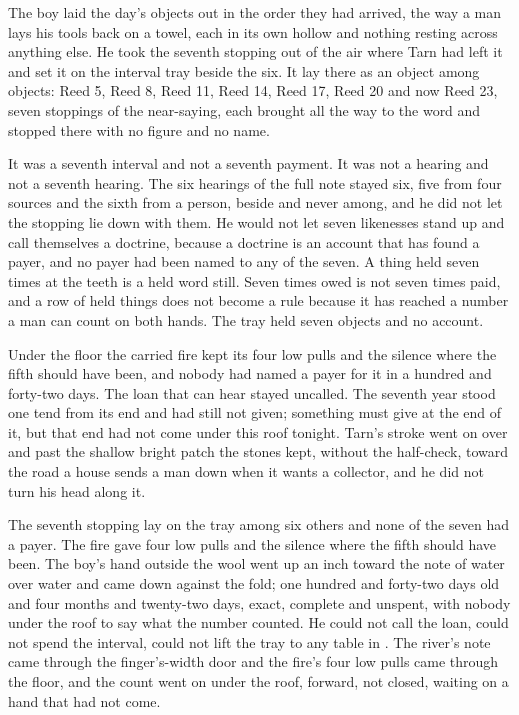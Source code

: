 The boy laid the day's objects out in the order they had arrived, the way a man lays his tools back on a towel, each in its own hollow and nothing resting across anything else. He took the seventh stopping out of the air where Tarn had left it and set it on the interval tray beside the six. It lay there as an object among objects: Reed 5, Reed 8, Reed 11, Reed 14, Reed 17, Reed 20 and now Reed 23, seven stoppings of the near-saying, each brought all the way to the word and stopped there with no figure and no name.

It was a seventh interval and not a seventh payment. It was not a hearing and not a seventh hearing. The six hearings of the full note stayed six, five from four sources and the sixth from a person, beside and never among, and he did not let the stopping lie down with them. He would not let seven likenesses stand up and call themselves a doctrine, because a doctrine is an account that has found a payer, and no payer had been named to any of the seven. A thing held seven times at the teeth is a held word still. Seven times owed is not seven times paid, and a row of held things does not become a rule because it has reached a number a man can count on both hands. The tray held seven objects and no account.

Under the floor the carried fire kept its four low pulls and the silence where the fifth should have been, and nobody had named a payer for it in a hundred and forty-two days. The loan that can hear stayed uncalled. The seventh year stood one tend from its end and had still not given; something must give at the end of it, but that end had not come under this roof tonight. Tarn's stroke went on over  and past the shallow bright patch the stones kept, without the half-check, toward the road a house sends a man down when it wants a collector, and he did not turn his head along it.

The seventh stopping lay on the tray among six others and none of the seven had a payer. The fire gave four low pulls and the silence where the fifth should have been. The boy's hand outside the wool went up an inch toward the note of water over water and came down against the fold; one hundred and forty-two days old and four months and twenty-two days, exact, complete and unspent, with nobody under the roof to say what the number counted. He could not call the loan, could not spend the interval, could not lift the tray to any table in . The river's note came through the finger's-width door and the fire's four low pulls came through the floor, and the count went on under the roof, forward, not closed, waiting on a hand that had not come.
